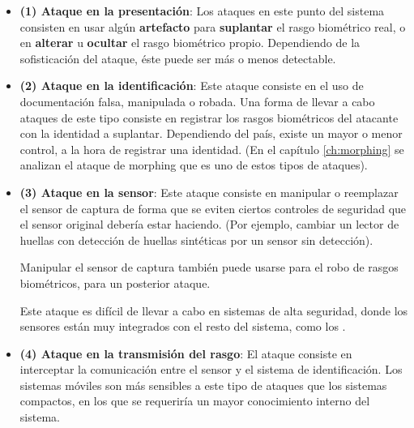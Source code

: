 \begin{itemize}
    \item 
    \textbf{(1) Ataque en la presentación}:
    Los ataques en este punto del sistema consisten en usar algún \textbf{artefacto} para \textbf{suplantar} el rasgo biométrico real, o en \textbf{alterar} u \textbf{ocultar} el rasgo biométrico propio. Dependiendo de la sofisticación del ataque, éste puede ser más o menos detectable.
    \item 
    \textbf{(2) Ataque en la identificación}:
    Este ataque consiste en el uso de documentación falsa, manipulada o robada. Una forma de llevar a cabo ataques de este tipo consiste en registrar los rasgos biométricos del atacante con la identidad a suplantar. Dependiendo del país, existe un mayor o menor control, a la hora de registrar una identidad. (En el capítulo \ref{ch:morphing} se analizan el ataque de morphing que es uno de estos tipos de ataques). 
    \item 
    \textbf{(3) Ataque en la sensor}:
    Este ataque consiste en manipular o reemplazar el sensor de captura de forma que se eviten ciertos controles de seguridad que el sensor original debería estar haciendo. (Por ejemplo, cambiar un lector de huellas con detección de huellas sintéticas por un sensor sin detección).
    
    Manipular el sensor de captura también puede usarse para el robo de rasgos biométricos, para un posterior ataque.
    
    Este ataque es difícil de llevar a cabo en sistemas de alta seguridad, donde los sensores están muy integrados con el resto del sistema, como los . 
    \item 
    \textbf{(4) Ataque en la transmisión del rasgo}:
    El ataque consiste en interceptar la comunicación entre el sensor y el sistema de identificación. Los sistemas móviles son más sensibles a este tipo de ataques que los sistemas compactos, en los que se requeriría un mayor conocimiento interno del sistema.
    

\end{itemize}
